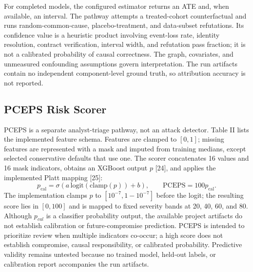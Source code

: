 \documentclass[conference]{IEEEtran}
\begin{document}
For completed models, the configured estimator returns an ATE and, when available, an interval. The pathway attempts a treated-cohort counterfactual and runs random-common-cause, placebo-treatment, and data-subset refutations. Its confidence value is a heuristic product involving event-loss rate, identity resolution, contract verification, interval width, and refutation pass fraction; it is not a calibrated probability of causal correctness. The graph, covariates, and unmeasured confounding assumptions govern interpretation. The run artifacts contain no independent component-level ground truth, so attribution accuracy is not reported.

\subsection{PCEPS Risk Scorer}
PCEPS is a separate analyst-triage pathway, not an attack detector. Table II lists the implemented feature schema. Features are clamped to $[0,1]$; missing features are represented with a mask and imputed from training medians, except selected conservative defaults that use one. The scorer concatenates 16 values and 16 mask indicators, obtains an XGBoost output $p$ [24], and applies the implemented Platt mapping [25]:
\begin{equation}
p_{\mathrm{cal}}=\sigma\!\left(a\,\mathrm{logit}(\mathrm{clamp}(p))+b\right),\qquad \mathrm{PCEPS}=100p_{\mathrm{cal}}.
\label{eq:pceps}
\end{equation}
The implementation clamps $p$ to $[10^{-7},1-10^{-7}]$ before the logit; the resulting score lies in $[0,100]$ and is mapped to fixed severity bands at 20, 40, 60, and 80. Although $p_{cal}$ is a classifier probability output, the available project artifacts do not establish calibration or future-compromise prediction.
PCEPS is intended to prioritize review when multiple indicators co-occur; a high score does not establish compromise, causal responsibility, or calibrated probability. Predictive validity remains untested because no trained model, held-out labels, or calibration report accompanies the run artifacts.
\end{document}
